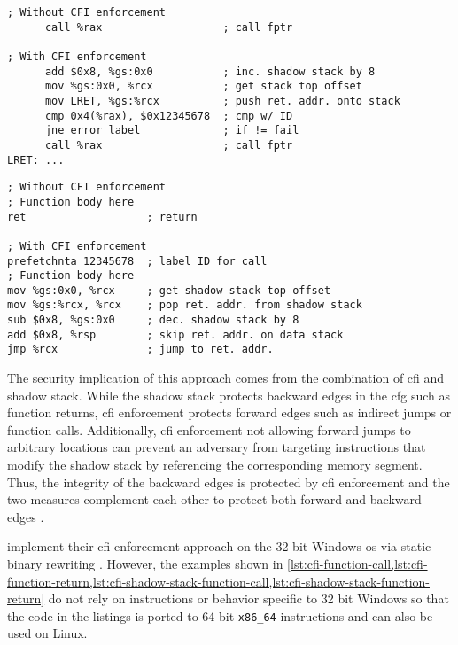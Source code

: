 \begin{lstlisting}[float=ht,caption={Function call without and with \acs{cfi} enforcement and shadow stack usage according to the implementation of {\citeauthor{Abadi2005}} (own code based on {\cite[348\psqq]{Abadi2005}})},label={lst:cfi-shadow-stack-function-call}]
; Without CFI enforcement
      call %rax                   ; call fptr

; With CFI enforcement
      add $0x8, %gs:0x0           ; inc. shadow stack by 8
      mov %gs:0x0, %rcx           ; get stack top offset
      mov LRET, %gs:%rcx          ; push ret. addr. onto stack
      cmp 0x4(%rax), $0x12345678  ; cmp w/ ID
      jne error_label             ; if != fail
      call %rax                   ; call fptr
LRET: ...
\end{lstlisting}

\begin{lstlisting}[float=ht,caption={Return from function without and with \acs{cfi} enforcement and shadow stack usage according to the implementation of {\citeauthor{Abadi2005}} (own code based on {\cite[348\psqq]{Abadi2005}})},label={lst:cfi-shadow-stack-function-return}]
; Without CFI enforcement
; Function body here
ret                   ; return

; With CFI enforcement
prefetchnta 12345678  ; label ID for call
; Function body here
mov %gs:0x0, %rcx     ; get shadow stack top offset
mov %gs:%rcx, %rcx    ; pop ret. addr. from shadow stack
sub $0x8, %gs:0x0     ; dec. shadow stack by 8
add $0x8, %rsp        ; skip ret. addr. on data stack
jmp %rcx              ; jump to ret. addr.
\end{lstlisting}

The security implication of this approach comes from the combination of \gls{cfi} and shadow stack.
While the shadow stack protects backward edges in the \gls{cfg} such as function returns, \gls{cfi} enforcement protects forward edges such as indirect jumps or function calls.
Additionally, \gls{cfi} enforcement not allowing forward jumps to arbitrary locations can prevent an adversary from targeting instructions that modify the shadow stack by referencing the corresponding memory segment.
Thus, the integrity of the backward edges is protected by \gls{cfi} enforcement and the two measures complement each other to protect both forward and backward edges \cite[348\psq]{Abadi2005}.

\bigskip\noindent
{} implement their \gls{cfi} enforcement approach on the 32 bit Windows \gls{os} via static binary rewriting \cite[345\psq]{Abadi2005}.
However, the examples shown in \cref{lst:cfi-function-call,lst:cfi-function-return,lst:cfi-shadow-stack-function-call,lst:cfi-shadow-stack-function-return} do not rely on instructions or behavior specific to 32 bit Windows so that the code in the listings is ported to 64 bit \texttt{x86\_64} instructions and can also be used on Linux.

